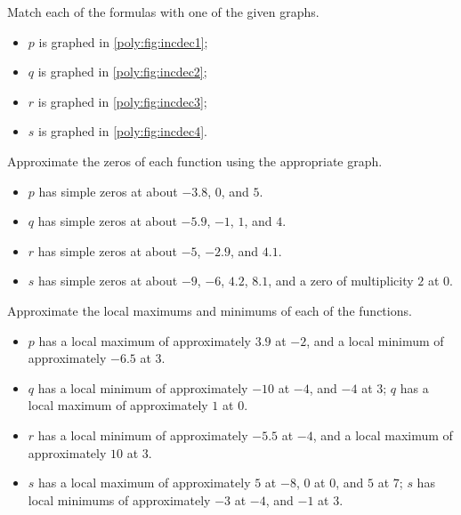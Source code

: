 \begin{exercises}
\begin{problem}
\begin{subproblem}
 	Match each of the formulas with one of the given graphs.
 	\begin{shortsolution}
 		\begin{itemize}
 			\item $p$ is graphed in \vref{poly:fig:incdec1};
 			\item $q$ is graphed in \vref{poly:fig:incdec2};
 			\item $r$ is graphed in \vref{poly:fig:incdec3};
 			\item $s$ is graphed in \vref{poly:fig:incdec4}.
 		\end{itemize}
 	\end{shortsolution}
 \end{subproblem}
 \begin{subproblem}
 	Approximate the zeros of each function using the appropriate graph.
 	\begin{shortsolution}
 		\begin{itemize}
 			\item $p$ has simple zeros at about $-3.8$, $0$, and $5$.
 			\item $q$ has simple zeros at about $-5.9$, $-1$, $1$, and $4$.
 			\item $r$ has simple zeros at about $-5$, $-2.9$, and $4.1$.
 			\item $s$ has simple zeros at about $-9$, $-6$, $4.2$, $8.1$, and a zero of multiplicity $2$ at $0$.
 		\end{itemize}
 	\end{shortsolution}
 \end{subproblem}
 \begin{subproblem}
 	Approximate the local maximums and minimums of each of the functions.
 	\begin{shortsolution}
 		\begin{itemize}
 			\item $p$ has a local maximum of approximately $3.9$ at $-2$, and a local minimum of approximately $-6.5$ at $3$.
 			\item $q$ has a local minimum of approximately $-10$ at $-4$, and $-4$ at $3$; $q$ has a local maximum of approximately $1$ at $0$.
 			\item $r$ has a local minimum of approximately $-5.5$ at $-4$, and a local maximum of approximately $10$ at $3$.
 			\item $s$ has a local maximum of approximately $5$ at $-8$, $0$ at $0$, and $5$ at  $7$; $s$ has local minimums 
 			of approximately $-3$ at $-4$, and $-1$ at $3$.
 		\end{itemize}

\end{shortsolution}
\end{subproblem}
\end{problem}
\end{exercises}
